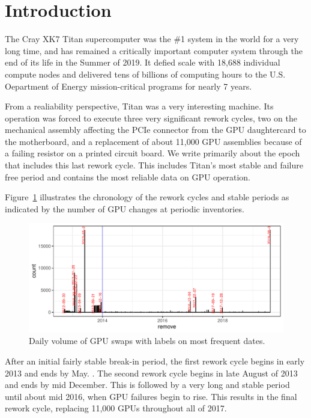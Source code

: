 \section{Introduction}
\label{section:introduction}

The Cray XK7 Titan supercomputer was the \#1 system in the world for a
very long time, and has remained a critically important computer
system through the end of its life in the Summer of 2019. It defied
scale with 18,688 individual compute nodes and delivered tens of
billions of computing hours to the U.S. Oepartment of Energy
mission-critical programs for nearly 7 years.
 
From a realiability perspective, Titan was a very interesting
machine. Its operation was forced to execute three very significant
rework cycles, two on the mechanical assembly affecting the PCIe
connector from the GPU daughtercard to the motherboard, and a
replacement of about 11,000 GPU assemblies because of a failing
resistor on a printed circuit board. We write primarily about the epoch
that includes this last rework cycle. This includes Titan's most
stable and failure free period and contains the most reliable data on
GPU operation.

Figure~\ref{fig:chronology} illustrates the chronology of the rework
cycles and stable periods as indicated by the number of GPU changes at
periodic inventories.
\begin{figure}[tbp]
  \centering
  \includegraphics[width=\textwidth]{figs/chronology001.pdf}
  \caption{Daily volume of GPU swaps with labels on most frequent dates.}
  \label{fig:chronology}
\end{figure}
After an initial fairly stable break-in period, the first rework cycle
begins in early 2013 and ends by May. . The second
rework cycle begins in late August of 2013 and ends by mid
December. This is followed by a very long and stable period until
about mid 2016, when GPU failures begin to rise. This results in the
final rework cycle, replacing 11,000 GPUs throughout all of 2017. 

